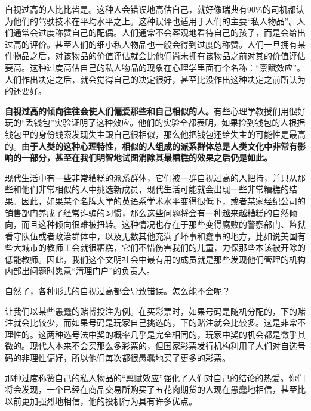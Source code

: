 自视过高的人比比皆是。这种人会错误地高估自己，就好像瑞典有90\%的司机都认为他们的驾驶技术在平均水平之上。这种误评也适用于人们的主要“私人物品”。人们通常会过度称赞自己的配偶。人们通常不会客观地看待自己的孩子，而是会给出过高的评价。甚至人们的细小私人物品也一般会得到过度的称赞。人们一旦拥有某件物品之后，对该物品的价值评估就会比他们尚未拥有该物品之前对其的价值评估要高。这种过度高估自己的私人物品的现象在心理学里面有个名称：“禀赋效应”。人们作出决定之后，就会觉得自己的决定很好，甚至比没作出这种决定之前所认为的还要好。
\par

\textbf{自视过高的倾向往往会使人们偏爱那些和自己相似的人。}有些心理学教授们用很好玩的“丢钱包”实验证明了这种效应。他们的实验全都表明，如果捡到钱包的人根据钱包里的身份线索发现失主跟自己很相似，那么他把钱包还给失主的可能性是最高的。\textbf{由于人类的这种心理特性，相似的人组成的派系群体总是人类文化中非常有影响的一部分，甚至在我们明智地试图消除其最糟糕的效果之后仍是如此。}
\par

现代生活中有一些非常糟糕的派系群体，它们被一群自视过高的人把持，并只从那些和他们非常相似的人中挑选新成员，现代生活可能就会出现一些非常糟糕的结果。因此，如果某个名牌大学的英语系学术水平变得很低下，或者某家经纪公司的销售部门养成了经常诈骗的习惯，那么这些问题将会有一种越来越糟糕的自然倾向，而且这种倾向很难被扭转。这种情况也存在于那些变得腐败的警察部门、监狱看守队伍或者政治群体中，以及无数其他充满了坏事和蠢事的地方，比如说美国有些大城市的教师工会就很糟糕，它们不惜伤害我们的儿童，力保那些本该被开除的低能教师。因此，我们这个文明社会中最有用的成员就是那些发现他们管理的机构内部出问题时愿意“清理门户”的负责人。
\par

自然了，各种形式的自视过高都会导致错误。怎么能不会呢？
\par

让我们以某些愚蠢的赌博投注为例。在买彩票时，如果号码是随机分配的，下的赌注就会比较少，而如果号码是玩家自己挑选的，下的赌注就会比较多。这是非常不理性的。这两种选号法中奖的概率几乎是完全相同的，玩家中奖的机会都是微乎其微的。现代人本来不会买那么多彩票的，但国家彩票发行机构利用了人们对自选号码的非理性偏好，所以他们每次都很愚蠢地买了更多的彩票。
\par

那种过度称赞自己的私人物品的“禀赋效应”强化了人们对自己的结论的热爱。你们将会发现，一个已经在商品交易所购买了五花肉期货的人现在愚蠢地相信，甚至比以前更加强烈地相信，他的投机行为具有许多优点。
\par

